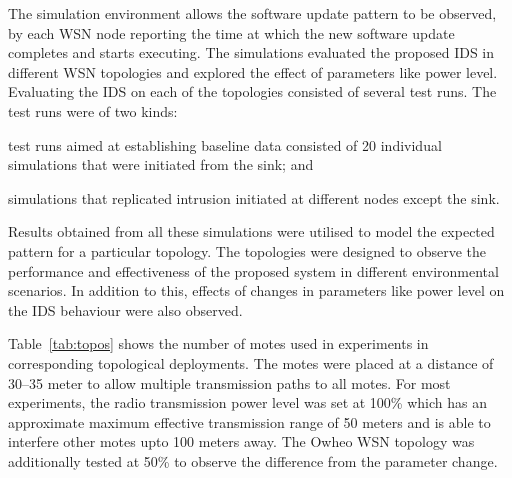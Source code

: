 \documentclass[conference,final]{IEEEtran}
\newcommand{\notedme}[1]{\raisebox{0pt}[0pt][0pt]{\pdfcomment[open=true,color=blue]{#1}}}
\begin{document}

The simulation environment allows the software update pattern to be observed, by each WSN node reporting the time at which the new software update completes and starts executing.
The simulations evaluated the proposed IDS in different WSN topologies and explored the effect of parameters like power level.
Evaluating the IDS on each of the topologies consisted of several test runs.
The test runs were of two kinds: 
\begin{inparaenum}
\item test runs aimed at establishing baseline data consisted of 20 individual simulations that were initiated from the sink; and
\item simulations that replicated intrusion initiated at different nodes except the sink.
\end{inparaenum}
Results obtained from all these simulations were utilised to model the expected pattern for a particular topology.
%
The topologies were designed to observe the performance and effectiveness %
of the proposed system in different environmental scenarios. 
In addition to this, effects of changes in parameters like power level on the IDS behaviour were also observed.


Table~\ref{tab:topos} shows the number of motes used in experiments in corresponding topological  deployments.
The motes were placed at a distance of 30--35 meter to allow  multiple transmission paths to all motes. %
For most experiments, the radio transmission power level was set at 100\% which has an approximate maximum effective transmission range of 50 meters and is able to interfere other motes upto 100 meters away.
The Owheo WSN topology was additionally tested at 50\%  to %
observe the difference from the parameter change.
\end{document}
